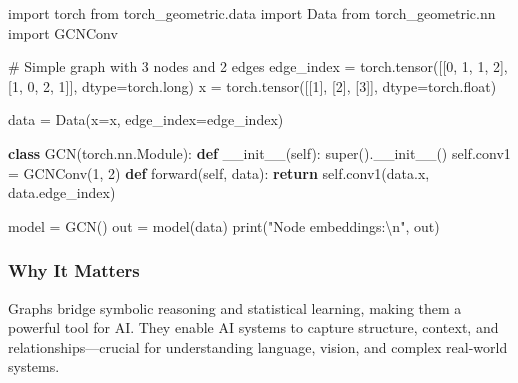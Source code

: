\documentclass[
  letterpaper,
  DIV=11,
  numbers=noendperiod]{scrreprt}
\newenvironment{Shaded}{\begin{snugshade}}{\end{snugshade}}
\newcommand{\BuiltInTok}[1]{\textcolor[rgb]{0.00,0.23,0.31}{#1}}
\newcommand{\CharTok}[1]{\textcolor[rgb]{0.13,0.47,0.30}{#1}}
\newcommand{\CommentTok}[1]{\textcolor[rgb]{0.37,0.37,0.37}{#1}}
\newcommand{\ControlFlowTok}[1]{\textcolor[rgb]{0.00,0.23,0.31}{\textbf{#1}}}
\newcommand{\DecValTok}[1]{\textcolor[rgb]{0.68,0.00,0.00}{#1}}
\newcommand{\FunctionTok}[1]{\textcolor[rgb]{0.28,0.35,0.67}{#1}}
\newcommand{\ImportTok}[1]{\textcolor[rgb]{0.00,0.46,0.62}{#1}}
\newcommand{\KeywordTok}[1]{\textcolor[rgb]{0.00,0.23,0.31}{\textbf{#1}}}
\newcommand{\NormalTok}[1]{\textcolor[rgb]{0.00,0.23,0.31}{#1}}
\newcommand{\OperatorTok}[1]{\textcolor[rgb]{0.37,0.37,0.37}{#1}}
\newcommand{\StringTok}[1]{\textcolor[rgb]{0.13,0.47,0.30}{#1}}
\newcommand{\VariableTok}[1]{\textcolor[rgb]{0.07,0.07,0.07}{#1}}
\begin{document}
\begin{Shaded}
\begin{Highlighting}[]
\ImportTok{import}\NormalTok{ torch}
\ImportTok{from}\NormalTok{ torch\_geometric.data }\ImportTok{import}\NormalTok{ Data}
\ImportTok{from}\NormalTok{ torch\_geometric.nn }\ImportTok{import}\NormalTok{ GCNConv}

\CommentTok{\# Simple graph with 3 nodes and 2 edges}
\NormalTok{edge\_index }\OperatorTok{=}\NormalTok{ torch.tensor([[}\DecValTok{0}\NormalTok{, }\DecValTok{1}\NormalTok{, }\DecValTok{1}\NormalTok{, }\DecValTok{2}\NormalTok{],}
\NormalTok{                           [}\DecValTok{1}\NormalTok{, }\DecValTok{0}\NormalTok{, }\DecValTok{2}\NormalTok{, }\DecValTok{1}\NormalTok{]], dtype}\OperatorTok{=}\NormalTok{torch.}\BuiltInTok{long}\NormalTok{)}
\NormalTok{x }\OperatorTok{=}\NormalTok{ torch.tensor([[}\DecValTok{1}\NormalTok{], [}\DecValTok{2}\NormalTok{], [}\DecValTok{3}\NormalTok{]], dtype}\OperatorTok{=}\NormalTok{torch.}\BuiltInTok{float}\NormalTok{)}

\NormalTok{data }\OperatorTok{=}\NormalTok{ Data(x}\OperatorTok{=}\NormalTok{x, edge\_index}\OperatorTok{=}\NormalTok{edge\_index)}

\KeywordTok{class}\NormalTok{ GCN(torch.nn.Module):}
    \KeywordTok{def} \FunctionTok{\_\_init\_\_}\NormalTok{(}\VariableTok{self}\NormalTok{):}
        \BuiltInTok{super}\NormalTok{().}\FunctionTok{\_\_init\_\_}\NormalTok{()}
        \VariableTok{self}\NormalTok{.conv1 }\OperatorTok{=}\NormalTok{ GCNConv(}\DecValTok{1}\NormalTok{, }\DecValTok{2}\NormalTok{)}
    \KeywordTok{def}\NormalTok{ forward(}\VariableTok{self}\NormalTok{, data):}
        \ControlFlowTok{return} \VariableTok{self}\NormalTok{.conv1(data.x, data.edge\_index)}

\NormalTok{model }\OperatorTok{=}\NormalTok{ GCN()}
\NormalTok{out }\OperatorTok{=}\NormalTok{ model(data)}
\BuiltInTok{print}\NormalTok{(}\StringTok{"Node embeddings:}\CharTok{\textbackslash{}n}\StringTok{"}\NormalTok{, out)}
\end{Highlighting}
\end{Shaded}

\subsubsection{Why It Matters}\label{why-it-matters-77}

Graphs bridge symbolic reasoning and statistical learning, making them a
powerful tool for AI. They enable AI systems to capture structure,
context, and relationships---crucial for understanding language, vision,
and complex real-world systems.
\end{document}
